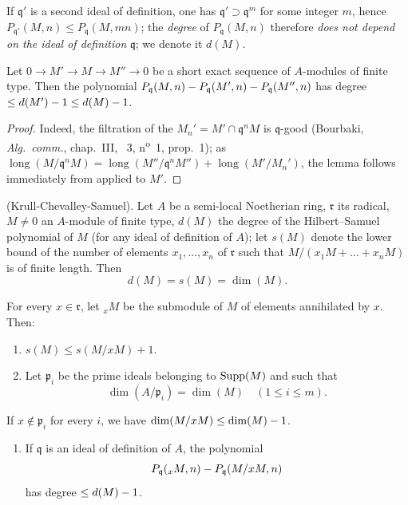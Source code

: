 If $\mathfrak{q}'$ is a second ideal of definition, one has $\mathfrak{q}'\supset\mathfrak{q}^m$ for some integer $m$, hence $P_{\mathfrak{q}'}(M,n)\leq P_\mathfrak{q}(M,mn)$; the \emph{degree} of $P_\mathfrak{q}(M,n)$ therefore \emph{does not depend on the ideal of definition} $\mathfrak{q}$; we denote it $d(M)$.

\begin{lemma}[16.2.2.2]
\label{0.16.2.2.2}
Let $0\to M'\to M\to M''\to 0$ be a short exact sequence of $A$-modules of finite type.
Then the polynomial $P_\mathfrak{q}(M,n)- P_\mathfrak{q}(M',n)- P_\mathfrak{q}(M'',n)$ has degree $\leq d(M')- 1\leq d(M)- 1$.
\end{lemma}

\begin{proof}
Indeed, the filtration of the $M_n'=M'\cap\mathfrak{q}^n M$ is $\mathfrak{q}$-good (Bourbaki, \emph{Alg.~comm.}, chap.~III, \textsection~3, n\textsuperscript{o}~1, prop.~1); as $\operatorname{long}(M/\mathfrak{q}^n M)=\operatorname{long}(M''/\mathfrak{q}^n M'')+\operatorname{long}(M'/M_n')$, the lemma follows immediately from  applied to $M'$.
\end{proof}

\begin{theorem}[16.2.3]
\label{0.16.2.3}
\textup{(Krull-Chevalley-Samuel).}
Let $A$ be a semi-local Noetherian ring, $\mathfrak{r}$ its radical, $M\neq 0$ an $A$-module of finite type, $d(M)$ the degree of the Hilbert--Samuel polynomial of $M$ (for any ideal of definition of $A$); let $s(M)$ denote the lower bound of the number of elements $x_1,\ldots,x_n$ of $\mathfrak{r}$ such that $M/(x_1M+\ldots+x_n M)$ is of finite length.
Then
\[
  d(M)=s(M)=\dim(M).
\]
\end{theorem}

\begin{lemma}[16.2.3.1]
\label{0.16.2.3.1}
For every $x\in\mathfrak{r}$, let ${}_x M$ be the submodule of $M$ of elements annihilated by $x$.
Then:
\begin{enumerate}
  \item[\rm{(i)}] $s(M)\leq s(M/x M)+1$.
  \item[\rm{(ii)}] Let $\mathfrak{p}_i$ be the prime ideals belonging to $\operatorname{Supp}(M)$ and such that
  \[
    \dim(A/\mathfrak{p}_i)=\dim(M)\quad(1\leq i\leq m).
  \]
\end{enumerate}
If $x\notin\mathfrak{p}_i$ for every $i$, we have $\dim(M/x M)\leq\dim(M)- 1$.
\begin{enumerate}
  \item[\rm{(iii)}] If $\mathfrak{q}$ is an ideal of definition of $A$, the polynomial
  \[
    P_\mathfrak{q}({}_x M,n)- P_\mathfrak{q}(M/x M,n)
  \]
  has degree $\leq d(M)- 1$.
\end{enumerate}
\end{lemma}

